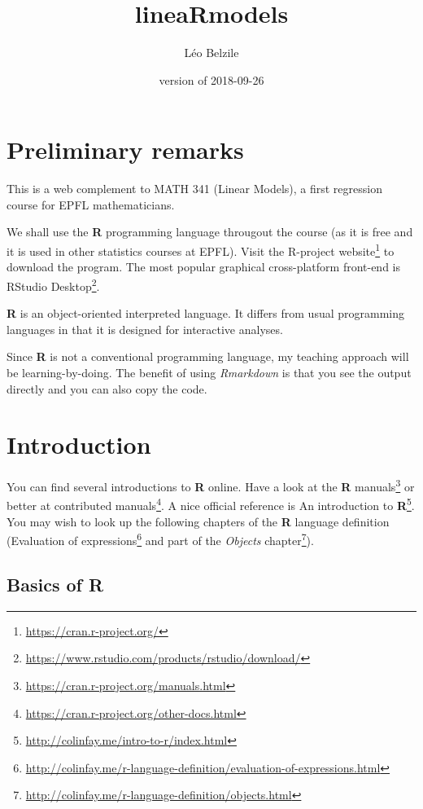 \documentclass[]{book}
\title{lineaRmodels}
\author{Léo Belzile}
\date{version of 2018-09-26}
\let\rmarkdownfootnote\footnote%
\def\footnote{\protect\rmarkdownfootnote}
\renewcommand{\href}[2]{#2\footnote{\url{#1}}}
\theoremstyle{definition}
\theoremstyle{definition}
\theoremstyle{definition}
\theoremstyle{remark}
\begin{document}
\maketitle

{
\setcounter{tocdepth}{1}
\tableofcontents
}
\chapter*{Preliminary remarks}\label{preliminary-remarks}

This is a web complement to MATH 341 (Linear Models), a first regression
course for EPFL mathematicians.

We shall use the \textbf{R} programming language througout the course
(as it is free and it is used in other statistics courses at EPFL).
Visit \href{https://cran.r-project.org/}{the R-project website} to
download the program. The most popular graphical cross-platform
front-end is
\href{https://www.rstudio.com/products/rstudio/download/}{RStudio
Desktop}.

\textbf{R} is an object-oriented interpreted language. It differs from
usual programming languages in that it is designed for interactive
analyses.

Since \textbf{R} is not a conventional programming language, my teaching
approach will be learning-by-doing. The benefit of using
\emph{Rmarkdown} is that you see the output directly and you can also
copy the code.

\chapter{Introduction}\label{introduction}

You can find several introductions to \textbf{R} online. Have a look at
the \href{https://cran.r-project.org/manuals.html}{\textbf{R} manuals}
or better at
\href{https://cran.r-project.org/other-docs.html}{contributed manuals}.
A nice official reference is
\href{http://colinfay.me/intro-to-r/index.html}{An introduction to
\textbf{R}}. You may wish to look up the following chapters of the
\textbf{R} language definition
(\href{http://colinfay.me/r-language-definition/evaluation-of-expressions.html}{Evaluation
of expressions} and part of the
\href{http://colinfay.me/r-language-definition/objects.html}{\emph{Objects}
chapter}).

\section{\texorpdfstring{Basics of
\textbf{R}}{Basics of R}}\label{basics-of-r}
\end{document}
